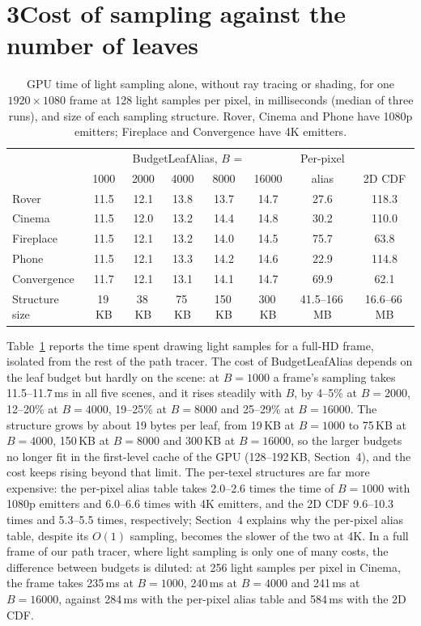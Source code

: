 \documentclass[10pt]{article}
\begin{document}
\section*{3\quad Cost of sampling against the number of leaves}

\begin{table}[H]
\centering\small
\setlength{\tabcolsep}{5pt}
\begin{tabular}{lccccc|cc}
\toprule
& \multicolumn{5}{c|}{BudgetLeafAlias, $B$ =} & Per-pixel & \\
& 1000 & 2000 & 4000 & 8000 & 16000 & alias & 2D CDF \\
\midrule
Rover & 11.5 & 12.1 & 13.8 & 13.7 & 14.7 & 27.6 & 118.3 \\
Cinema & 11.5 & 12.0 & 13.2 & 14.4 & 14.8 & 30.2 & 110.0 \\
Fireplace & 11.5 & 12.1 & 13.2 & 14.0 & 14.5 & 75.7 & 63.8 \\
Phone & 11.5 & 12.1 & 13.3 & 14.2 & 14.6 & 22.9 & 114.8 \\
Convergence & 11.7 & 12.1 & 13.1 & 14.1 & 14.7 & 69.9 & 62.1 \\
\midrule
Structure size & 19\,KB & 38\,KB & 75\,KB & 150\,KB & 300\,KB & 41.5--166\,MB & 16.6--66\,MB \\
\bottomrule
\end{tabular}
\caption{GPU time of light sampling alone, without ray tracing or shading, for one $1920\times1080$ frame at 128 light samples per pixel, in milliseconds (median of three runs), and size of each sampling structure. Rover, Cinema and Phone have 1080p emitters; Fireplace and Convergence have 4K emitters.}
\label{tab:sampling}
\end{table}

Table~\ref{tab:sampling} reports the time spent drawing light samples for a full-HD frame, isolated from the rest of the path tracer. The cost of BudgetLeafAlias depends on the leaf budget but hardly on the scene: at $B=1000$ a frame's sampling takes 11.5--11.7\,ms in all five scenes, and it rises steadily with $B$, by 4--5\% at $B=2000$, 12--20\% at $B=4000$, 19--25\% at $B=8000$ and 25--29\% at $B=16000$. The structure grows by about 19 bytes per leaf, from 19\,KB at $B=1000$ to 75\,KB at $B=4000$, 150\,KB at $B=8000$ and 300\,KB at $B=16000$, so the larger budgets no longer fit in the first-level cache of the GPU (128--192\,KB, Section~4), and the cost keeps rising beyond that limit. The per-texel structures are far more expensive: the per-pixel alias table takes 2.0--2.6 times the time of $B=1000$ with 1080p emitters and 6.0--6.6 times with 4K emitters, and the 2D CDF 9.6--10.3 times and 5.3--5.5 times, respectively; Section~4 explains why the per-pixel alias table, despite its $O(1)$ sampling, becomes the slower of the two at 4K. In a full frame of our path tracer, where light sampling is only one of many costs, the difference between budgets is diluted: at 256 light samples per pixel in Cinema, the frame takes 235\,ms at $B=1000$, 240\,ms at $B=4000$ and 241\,ms at $B=16000$, against 284\,ms with the per-pixel alias table and 584\,ms with the 2D CDF.
\end{document}
